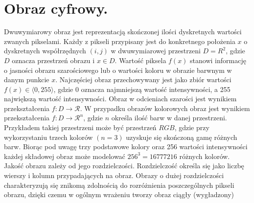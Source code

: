 \documentclass[a4paper,12pt,twoside,openany]{report}
\begin{document}
\section{Obraz cyfrowy.}
Dwuwymiarowy obraz jest reprezentacją skończonej ilości dyskretnych wartości zwanych pikselami.
Każdy z pikseli przypisany jest do konkretnego położenia $x$ o dyskretnych współrzędnych $(i,j)$ w dwuwymiarowej przestrzeni $D=R^2$, gdzie $D$ oznacza przestrzeń obrazu i $x \in D$.
Wartość piksela $f(x)$ stanowi informację o jasności obrazu szarościowego lub o wartości koloru w obrazie barwnym w danym punkcie $x$. Najczęściej obraz przechowywany jest jako zbiór wartości $f(x) \in \langle 0,255 \rangle$, gdzie 0 oznacza najmniejszą wartość intensywności, a 255 największą wartość intensywności. Obraz w odcieniach szarości jest wynikiem przekształcenia $f: D \rightarrow \mathcal{R}$.
W przypadku obrazów kolorowych obraz jest wynikiem przekształcenia $f: D \rightarrow \mathcal{R}^n$, gdzie $n$ określa ilość barw w danej przestrzeni.
Przykładem takiej przestrzeni może być przestrzeń $RGB$, gdzie przy wykorzystaniu trzech kolorów $(n=3)$ uzyskuje się skończoną gamę różnych barw. Biorąc pod uwagę trzy podstawowe kolory oraz 256 wartości intensywności każdej składowej obraz może modelować $256^3=16777216$ różnych kolorów. Jakość obrazu zależy od jego rozdzielczości. Rozdzielczość określa się jako liczbę wierszy i kolumn przypadających na obraz. Obrazy o dużej rozdzielczości charakteryzują się znikomą zdolnością do rozróżnienia poszczególnych pikseli obrazu, dzięki czemu w ogólnym wrażeniu tworzy obraz ciągły (wygładzony)
\end{document}
